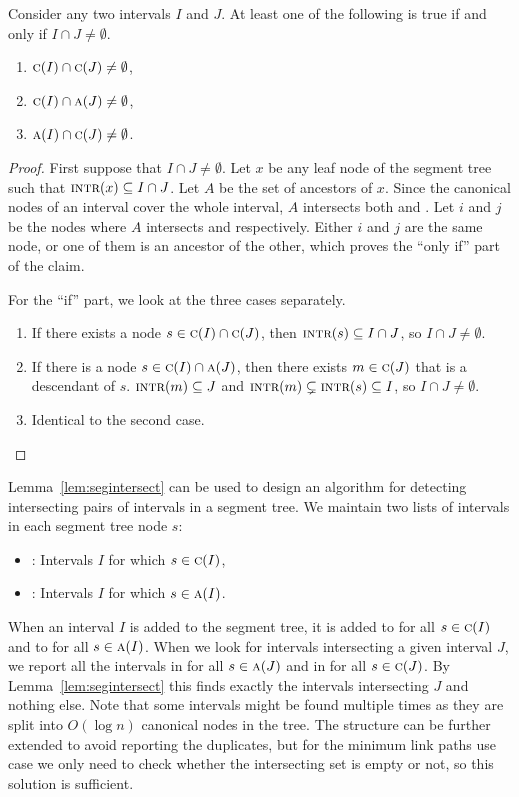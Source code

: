 \documentclass[english,gradu]{tktltiki2018}
\begin{document}
\begin{lem}\label{lem:segintersect}Consider any two intervals $I$ and $J$.
At least one of the following is true if and only if $I\cap J\neq\emptyset$.
\begin{enumerate}
\item $\textsc{c}(I)\cap\textsc{c}(J)\neq\emptyset$,
\item $\textsc{c}(I)\cap\textsc{a}(J)\neq\emptyset$,
\item $\textsc{a}(I)\cap\textsc{c}(J)\neq\emptyset$.
\end{enumerate}
\end{lem}
\begin{proof}
First suppose that $I\cap J\neq\emptyset$.
Let $x$ be any leaf node of the segment tree such that $\textsc{intr}(x)\subseteq I\cap J$.
Let $A$ be the set of ancestors of $x$.
Since the canonical nodes of an interval cover the whole interval, $A$ intersects both  and .
Let $i$ and $j$ be the nodes where $A$ intersects  and  respectively.
Either $i$ and $j$ are the same node, or one of them is an ancestor of the other, which proves the ``only if'' part of the claim.

For the ``if'' part, we look at the three cases separately.
\begin{enumerate}
\item If there exists a node $s\in\textsc{c}(I)\cap\textsc{c}(J)$, then $\textsc{intr}(s)\subseteq I\cap J$, so $I\cap J\neq\emptyset$.
\item If there is a node $s\in\textsc{c}(I)\cap\textsc{a}(J)$, then there exists $m\in\textsc{c}(J)$ that is a descendant of $s$. $\textsc{intr}(m)\subseteq J$ and $\textsc{intr}(m)\subsetneq\textsc{intr}(s)\subseteq I$, so $I\cap J\neq\emptyset$.
\item Identical to the second case.
\end{enumerate}
\end{proof}

Lemma~\ref{lem:segintersect} can be used to design an algorithm for detecting intersecting pairs of intervals in a segment tree.
We maintain two lists of intervals in each segment tree node $s$:
\begin{itemize}
\item {}: Intervals $I$ for which $s\in\textsc{c}(I)$,
\item {}: Intervals $I$ for which $s\in\textsc{a}(I)$.
\end{itemize}
When an interval $I$ is added to the segment tree, it is added to  for all $s\in\textsc{c}(I)$ and to  for all $s\in\textsc{a}(I)$.
When we look for intervals intersecting a given interval $J$, we report all the intervals in  for all $s\in\textsc{a}(J)$ and in  for all $s\in\textsc{c}(J)$.
By Lemma~\ref{lem:segintersect} this finds exactly the intervals intersecting $J$ and nothing else.
Note that some intervals might be found multiple times as they are split into $O(\log n)$ canonical nodes in the tree.
The structure can be further extended to avoid reporting the duplicates, but for the minimum link paths use case we only need to check whether the intersecting set is empty or not, so this solution is sufficient.
\end{document}
